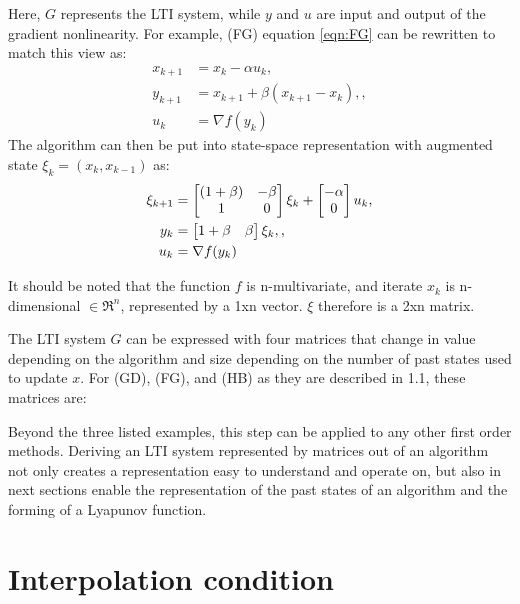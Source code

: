 Here, \(G\) represents the LTI system, while \(y\) and \(u\) are input and output of the gradient nonlinearity. For example, (FG) equation \ref{eqn:FG} can be rewritten to match this view as:
\begin{subequations} \label{eqn:FG2}
	\begin{align}
	  x_{k+1}     &=x_k-\alpha u_k \label{eq_FGstate},       \\
	  y_{k+1} &=x_{k+1}+\beta (x_{k+1}-x_k), \label{eq_FGinterpolated point}, \\
	  u_k &= \nabla f(y_k) \label{eq_FGggradient}
	\end{align}
	\end{subequations}
The algorithm can then be put into state-space representation with augmented state $\xi _k = (x_k, x_{k-1})$ as:
\begin{subequations} \label{eqn:FGss }
	\begin{align}
	  \xi_{k+1} &= \begin{bmatrix}(1+\beta) & -\beta\\ 1 & 0\end{bmatrix}\xi_k  + \begin{bmatrix}-\alpha\\ 0\end{bmatrix}u_k \label{eq_FGssstate}, \\
	  y_k &= \begin{bmatrix}1+\beta & \beta\end{bmatrix}\xi_k, \label{eq_FGssinterpolation},\\
	  u_k &= \nabla f(y_k) \label{eq_FGssgradient}
	\end{align}
	\end{subequations}

It should be noted that the function $f$ is n-multivariate, and iterate $x_k$ is n-dimensional $\in \Re^n$, represented by a 1xn vector. $\xi $ therefore is a 2xn matrix.

The LTI system \(G\) can be expressed with four matrices that change in value depending on the algorithm and size depending on the number of past states used to update \(x\). For (GD), (FG), and (HB) as they are described in 1.1, these matrices are:

Beyond the three listed examples, this step can be applied to any other first order methods. Deriving an LTI system represented by matrices out of an algorithm not only creates a representation easy to understand and operate on, but also in next sections enable the representation of the past states of an algorithm and the forming of a Lyapunov function.

\section{Interpolation condition}

